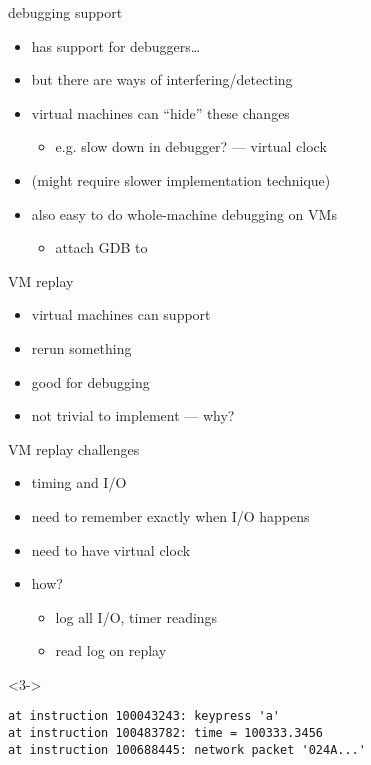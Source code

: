 
\begin{frame}{debugging support}
    \begin{itemize}
    \item {} has support for debuggers\ldots
    \item but there are ways of interfering/detecting
    \item virtual machines can ``hide'' these changes
        \begin{itemize}
        \item e.g. slow down in debugger? --- virtual clock
        \end{itemize}
    \item (might require slower implementation technique)
    \item also easy to do whole-machine debugging on VMs
        \begin{itemize}
        \item attach GDB to 
        \end{itemize}
    \end{itemize}
\end{frame}

\begin{frame}{VM replay}
    \begin{itemize}
    \item virtual machines can support 
    \item rerun something 
    \item good for debugging
    \vspace{.5cm}
    \item not trivial to implement --- why?
    \end{itemize}
\end{frame}

\begin{frame}[fragile,label=replayChallenge]{VM replay challenges}
    \begin{itemize}
    \item timing and I/O
    \item<2-> need to remember exactly when I/O happens
    \item<2-> need to have virtual clock
    \item<2-> how?
        \begin{itemize}
        \item<3-> log all I/O, timer readings
        \item<3-> read log on replay
        \end{itemize}
    \end{itemize}
\begin{visibleenv}<3->
\begin{Verbatim}[fontsize=\small]
at instruction 100043243: keypress 'a'
at instruction 100483782: time = 100333.3456
at instruction 100688445: network packet '024A...'
\end{Verbatim}
\end{visibleenv}
\end{frame}

